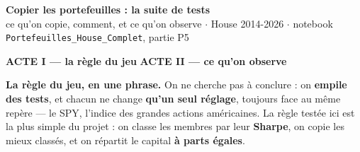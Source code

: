 \documentclass[10pt,a4paper]{article}
\begin{document}
\begin{center}
{\large\bfseries Copier les portefeuilles : la suite de tests}
\\[0.5mm]
{\scriptsize ce qu'on copie, comment, et ce qu'on observe $\cdot$ House 2014-2026
$\cdot$ notebook \texttt{Portefeuilles\_House\_Complet}, partie P5}
\end{center}
\vspace{1.4mm}

\begin{tcolorbox}[enhanced, colback=white, colframe=grisc, boxrule=0.5pt, arc=2pt,
                  left=3mm, right=3mm, top=1.5mm, bottom=1.5mm]
{\footnotesize\bfseries\color{bleu} ACTE I --- la règle du jeu}\hfill
{\footnotesize\bfseries\color{vert} ACTE II --- ce qu'on observe}\\[0.9mm]
\begin{center}
\end{center}
\vspace{0.2mm}
{\footnotesize\textbf{La règle du jeu, en une phrase.} On ne cherche pas à conclure : on \textbf{empile des
tests}, et chacun ne change \textbf{qu'un seul réglage}, toujours face au même repère --- le SPY, l'indice
des grandes actions américaines. La règle testée ici est la plus simple du projet : on classe les membres
par leur \textbf{Sharpe}, on copie les mieux classés, et on répartit le capital \textbf{à parts égales}.}
\end{tcolorbox}
\end{document}
